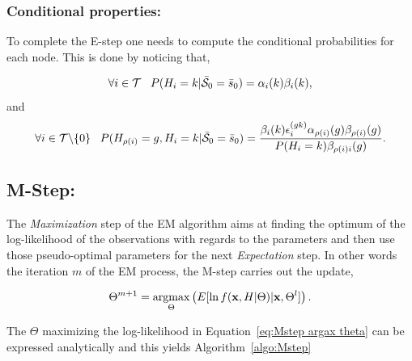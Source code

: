 \documentclass[a4paper,11pt]{report}
\begin{document}
			\subsubsection{Conditional properties:}
				\label{subsubsec:SCHMT/Learning/E/Cond}
				
				To complete the E-step one needs to compute the conditional probabilities for each node. This is done by noticing that,
				
				\begin{equation}
				  \forall i \in \mathcal{T} \;\;\; P(H_{i}=k | \bar{\mathcal{S}}_{0}=\bar{s}_{0}) = \alpha_{i}(k) \beta_{i}(k),
				  \label{eq:Estep cond proba node}
				\end{equation}
				and
				\begin{equation}
				  \forall i \in \mathcal{T}\backslash\{0\} 
				  \;\;\; P(H_{\rho(i)}=g, H_{i}=k | \bar{\mathcal{S}}_{0}=\bar{s}_{0}) = \frac{\beta_{i}(k)\epsilon_{i}^{(gk)}\alpha_{\rho(i)}(g)\beta_{\rho(i)}(g)}{P(H_{i}=k) \beta_{\rho(i)i}(g)}.
				  \label{eq:E-step cond proba and parent}
				\end{equation}
		
		\subsection{M-Step:}
			\label{subsec:SCHMT/Learning/M}
			
			The \textit{Maximization} step of the EM algorithm aims at finding the optimum of the log-likelihood of the observations with regards to the parameters and then use those pseudo-optimal parameters for the next \textit{Expectation} step. In other words the iteration $m$ of the EM process, the M-step carries out the update,
			
			\begin{equation}
				\Theta^{m+1} = \mathop{\rm argmax}_{\Theta} \left(E[\ln f({\bf x},H|\Theta)|{\bf x},\Theta^{l}] \right).
				\label{eq:Mstep argax theta}
			\end{equation}
			
			The $\Theta$ maximizing the log-likelihood in Equation~\ref{eq:Mstep argax theta} can be expressed analytically and this yields Algorithm~\ref{algo:Mstep}
			
\end{document}
